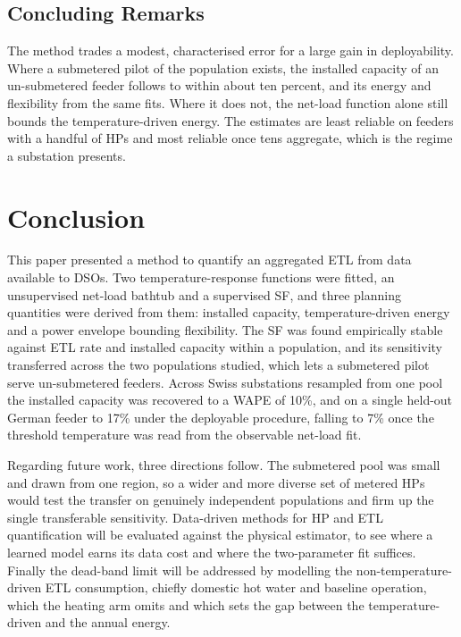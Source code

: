 \documentclass[9pt,journal,a4]{IEEEtran}
\begin{document}
\subsection{Concluding Remarks}

The method trades a modest, characterised error for a large gain in deployability. Where a submetered pilot of the population exists, the installed capacity of an un-submetered feeder follows to within about ten percent, and its energy and flexibility from the same fits. Where it does not, the net-load function alone still bounds the temperature-driven energy. The estimates are least reliable on feeders with a handful of HPs and most reliable once tens aggregate, which is the regime a substation presents.


\section{Conclusion}
\label{sec:conclusion}

This paper presented a method to quantify an aggregated ETL from data available to DSOs. Two temperature-response functions were fitted, an unsupervised net-load bathtub and a supervised SF, and three planning quantities were derived from them: installed capacity, temperature-driven energy and a power envelope bounding flexibility. The SF was found empirically stable against ETL rate and installed capacity within a population, and its sensitivity transferred across the two populations studied, which lets a submetered pilot serve un-submetered feeders. Across Swiss substations resampled from one pool the installed capacity was recovered to a WAPE of 10\%, and on a single held-out German feeder to 17\% under the deployable procedure, falling to 7\% once the threshold temperature was read from the observable net-load fit.

Regarding future work, three directions follow. The submetered pool was small and drawn from one region, so a wider and more diverse set of metered HPs would test the transfer on genuinely independent populations and firm up the single transferable sensitivity. Data-driven methods for HP and ETL quantification will be evaluated against the physical estimator, to see where a learned model earns its data cost and where the two-parameter fit suffices. Finally the dead-band limit will be addressed by modelling the non-temperature-driven ETL consumption, chiefly domestic hot water and baseline operation, which the heating arm omits and which sets the gap between the temperature-driven and the annual energy.

\balance


\end{document}
